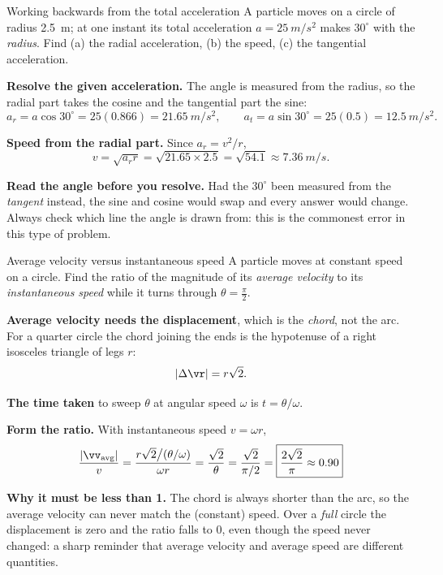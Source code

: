 \begin{exbox}{Working backwards from the total acceleration}
A particle moves on a circle of radius \SI{2.5}{m}; at one instant its total acceleration
$a=\SI{25}{m/s^2}$ makes $30^\circ$ with the \emph{radius}. Find (a) the radial acceleration, (b) the
speed, (c) the tangential acceleration.

 \textbf{Resolve the given acceleration.} The angle is measured from the radius, so the radial
part takes the cosine and the tangential part the sine:
\[
a_r=a\cos30^\circ=25(0.866)=\SI{21.65}{m/s^2},
\qquad
a_t=a\sin30^\circ=25(0.5)=\SI{12.5}{m/s^2}.
\]

 \textbf{Speed from the radial part.} Since $a_r=v^{2}/r$,
\[
v=\sqrt{a_r r}=\sqrt{21.65\times2.5}=\sqrt{54.1}\approx\SI{7.36}{m/s}.
\]

\smallskip
\textbf{Read the angle before you resolve.} Had the $30^\circ$ been measured from the \emph{tangent}
instead, the sine and cosine would swap and every answer would change. Always check which line the
angle is drawn from: this is the commonest error in this type of problem.
\end{exbox}

\begin{exbox}{Average velocity versus instantaneous speed}
A particle moves at constant speed on a circle. Find the ratio of the magnitude of its \emph{average
velocity} to its \emph{instantaneous speed} while it turns through $\theta=\tfrac{\pi}{2}$.

 \textbf{Average velocity needs the displacement}, which is the \emph{chord}, not the arc. For
a quarter circle the chord joining the ends is the hypotenuse of a right isosceles triangle of legs
$r$:
\[
|\Delta\vr|=r\sqrt2.
\]

 \textbf{The time taken} to sweep $\theta$ at angular speed $\omega$ is $t=\theta/\omega$.

 \textbf{Form the ratio.} With instantaneous speed $v=\omega r$,
\[
\frac{|\vv_{\text{avg}}|}{v}
=\frac{r\sqrt2\big/(\theta/\omega)}{\omega r}
=\frac{\sqrt2}{\theta}
=\frac{\sqrt2}{\pi/2}
=\boxed{\frac{2\sqrt2}{\pi}\approx0.90}
\]

 \textbf{Why it must be less than 1.} The chord is always shorter than the arc, so the average
velocity can never match the (constant) speed. Over a \emph{full} circle the displacement is zero and
the ratio falls to $0$, even though the speed never changed: a sharp reminder that average velocity and
average speed are different quantities. 
\end{exbox}

